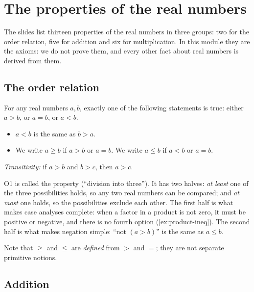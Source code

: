 \section{The properties of the real numbers}\label{sec:axioms}

The slides list thirteen properties of the real numbers in three groups: two for the order relation, five
for addition and six for multiplication. In this module they are the axioms: we do not prove them, and every
other fact about real numbers is derived from them.

\subsection{The order relation}

\begin{definition}
\begin{description}[style=sameline, leftmargin=3.2em, font=\sffamily\bfseries\color{defcol}]
  \item[O1] For any real numbers $a,b$, exactly one of the following statements is true: either $a>b$, or
  $a=b$, or $a<b$.
  \begin{itemize}
    \item $a<b$ is the same as $b>a$.
    \item We write $a\ge b$ if $a>b$ or $a=b$. We write $a\le b$ if $a<b$ or $a=b$.
  \end{itemize}
  \item[O2] \emph{Transitivity:} if $a>b$ and $b>c$, then $a>c$.
\end{description}
\end{definition}

O1 is called the  property (``division into three''). It has two halves: \emph{at least}
one of the three possibilities holds, so any two real numbers can be compared; and \emph{at most} one holds,
so the possibilities exclude each other. The first half is what makes case analyses complete: when a factor
in a product is not zero, it must be positive or negative, and there is no fourth option
(\cref{ex:product-ineq}). The second half is what makes negation simple: ``not $(a>b)$'' is the same as
$a\le b$.

Note that $\ge$ and $\le$ are \emph{defined} from $>$ and $=$; they are not separate primitive notions.

\subsection{Addition}

